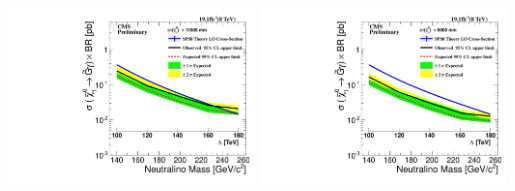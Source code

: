 \begin{center}
\includegraphics[width=0.49\textwidth,height=0.5\textwidth]{THESISPLOTS/Neutralino_CrosSecVsMass_Exclusion_limit_11000.pdf}
\includegraphics[width=0.49\textwidth,height=0.5\textwidth]{THESISPLOTS/Neutralino_CrosSecVsMass_Exclusion_limit_6000.pdf}
\label{fig:limits}
\end{center}


